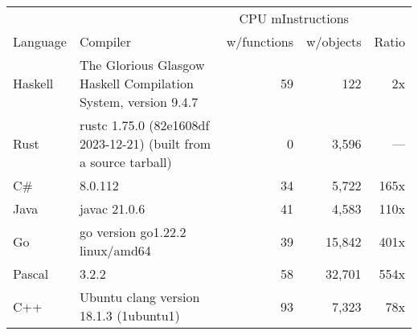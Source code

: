 \documentclass{article}
\begin{document}
      \begin{tabularx}{\linewidth}{lXrrr}
      \toprule
        & & \multicolumn{2}{c}{CPU mInstructions} & \\
        Language & Compiler & w/functions & w/objects & Ratio \\
      \midrule
    Haskell & The Glorious Glasgow Haskell Compilation System, version 9.4.7 & 59 & 122 & 2x \\
Rust & rustc 1.75.0 (82e1608df 2023-12-21) (built from a source tarball) & 0 & 3,596 & --- \\
C\# & 8.0.112 & 34 & 5,722 & 165x \\
Java & javac 21.0.6 & 41 & 4,583 & 110x \\
Go & go version go1.22.2 linux/amd64 & 39 & 15,842 & 401x \\
Pascal & 3.2.2 & 58 & 32,701 & 554x \\
C++ & Ubuntu clang version 18.1.3 (1ubuntu1) & 93 & 7,323 & 78x \\

      \bottomrule
      \end{tabularx}
      
\end{document}
